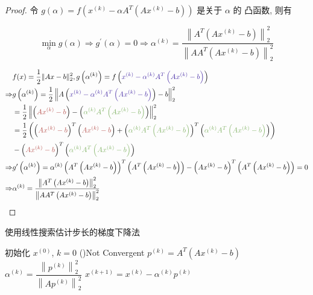 \begin{proof}
    令 $ g(\alpha)=f\left(x^{(k)}-\alpha A^{T}\left(A x^{(k)}-b\right)\right) $ 是关于 $ \alpha $ 的 凸函数, 则有

$$
\min _{\alpha} g(\alpha) \Rightarrow g^{\prime}(\alpha)=0 \Rightarrow \alpha^{(k)}=\frac{\left\|A^{T}\left(A x^{(k)}-b\right)\right\|_{2}^{2}}{\left\|A A^{T}\left(A x^{(k)}-b\right)\right\|_{2}^{2}}
$$


$$\begin{aligned}
    & f(x)=\frac{1}{2}\|A x-b\|_{2}^{2}, g\left(\alpha^{(k)}\right)=f\left({\color{violet} x^{(k)}-\alpha^{(k)} A^{T}\left(A x^{(k)}-b\right)} \right) \\
    \Rightarrow & g\left(\alpha^{(k)}\right)=\frac{1}{2}\left\|A\left({\color{violet} x^{(k)}-\alpha^{(k)} A^{T}\left(A x^{(k)}-b\right)} \right)-b\right\|_{2}^{2} \\
    &=\frac{1}{2}\left\|\left({\color{coral} A x^{(k)}-b} \right)-\left({\color{grass} \alpha^{(k)} A^{T}\left(A x^{(k)}-b\right)} \right)\right\|_{2}^{2} \\
    &=\frac{1}{2}\left(\left({\color{coral} A x^{(k)}-b} \right)^{T}\left({\color{coral} A x^{(k)}-b} \right)+\left({\color{grass} \alpha^{(k)} A^{T}\left(A x^{(k)}-b\right)} \right)^{T}\left({\color{grass} \alpha^{(k)} A^{T}\left(A x^{(k)}-b\right)} \right)\right) \\
    &-\left({\color{coral} A x^{(k)}-b} \right)^{T}\left({\color{grass} \alpha^{(k)} A^{T}\left(A x^{(k)}-b\right)} \right) \\
    \Rightarrow & g^{\prime}\left(\alpha^{(k)}\right)=\alpha^{(k)}\left(A^{T}\left(A x^{(k)}-b\right)\right)^{T}\left(A^{T}\left(A x^{(k)}-b\right)\right)-\left(A x^{(k)}-b\right)^{T}\left(A^{T}\left(A x^{(k)}-b\right)\right)=0 \\
    \Rightarrow &\alpha^{(k)}=\frac{\left\|A^{T}\left(A x^{(k)}-b\right)\right\|_{2}^{2}}{\left\|A A^{T}\left(A x^{(k)}-b\right)\right\|_{2}^{2}}
    \end{aligned}$$

\end{proof}


\begin{algorithm}[htbp]
    \caption{使用线性搜索估计步长的梯度下降法}
    初始化 $ x^{(0)} $, $k=0$\;
    \While(){Not Convergent}{
        $p^{(k)}=A^{T}\left(A x^{(k)}-b\right)$\;
        $\alpha^{(k)}=\dfrac{\left\|p^{(k)}\right\|_{2}^{2}}{\left\|A p^{(k)}\right\|_{2}^{2}}$\;
        $x^{(k+1)}=x^{(k)}-\alpha^{(k)} p^{(k)}$\;
    }
\end{algorithm}